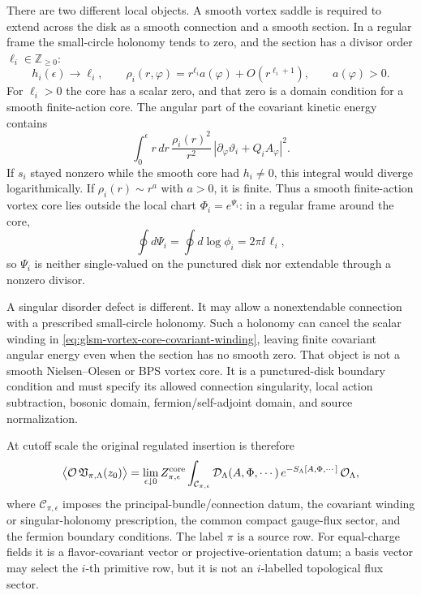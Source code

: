 \begin{construction}
There are two different local objects.  A smooth vortex saddle is required to
extend across the disk as a smooth connection and a smooth section.  In a
regular frame the small-circle holonomy tends to zero, and the section has a
divisor order \(\ell_i\in\mathbb Z_{\ge0}\):
\begin{equation}
  h_i(\epsilon)\longrightarrow \ell_i,\qquad
  \rho_i(r,\varphi)=r^{\ell_i}a(\varphi)+O(r^{\ell_i+1}),
  \qquad a(\varphi)>0 .
  \label{eq:glsm-vortex-core-boundary-data}
\end{equation}
For \(\ell_i>0\) the core has a scalar zero, and that zero is a domain
condition for a smooth finite-action core.  The angular part of the covariant
kinetic energy contains
\[
  \int_0^\epsilon r\,dr\,
  \frac{\rho_i(r)^2}{r^2}\,
  \left|\partial_\varphi\vartheta_i+Q_iA_\varphi\right|^2 .
\]
If \(s_i\) stayed nonzero while the smooth core had \(h_i\ne0\), this integral
would diverge logarithmically.  If \(\rho_i(r)\sim r^a\) with \(a>0\), it is
finite.  Thus a smooth finite-action vortex core lies outside the local chart
\(\Phi_i=e^{\Psi_i}\): in a regular frame around the core,
\[
  \oint d\Psi_i
  =
  \oint d\log\phi_i
  =
  2\pi\ii\,\ell_i ,
\]
so \(\Psi_i\) is neither single-valued on the punctured disk nor extendable
through a nonzero divisor.

A singular disorder defect is different.  It may allow a nonextendable
connection with a prescribed small-circle holonomy.  Such a holonomy can
cancel the scalar winding in
\eqref{eq:glsm-vortex-core-covariant-winding}, leaving finite covariant
angular energy even when the section has no smooth zero.  That object is not a
smooth Nielsen--Olesen or BPS vortex core.  It is a punctured-disk boundary
condition and must specify its allowed connection singularity, local action
subtraction, bosonic domain, fermion/self-adjoint domain, and source
normalization.

At cutoff scale the original regulated insertion is therefore
\begin{equation}
  \bigl\langle{\mathcal O}\,{\mathfrak V}_{\pi,\Lambda}(z_0)\bigr\rangle
  =
  \lim_{\epsilon\downarrow0}
  Z_{\pi,\epsilon}^{\rm core}
  \int_{\mathcal C_{\pi,\epsilon}}
  {\mathcal D}_{\Lambda}(A,\Phi,\cdots)\,
  e^{-S_\Lambda[A,\Phi,\cdots]}\,
  {\mathcal O}_{\Lambda},
  \label{eq:glsm-vortex-core-disorder-path-integral}
\end{equation}
where \(\mathcal C_{\pi,\epsilon}\) imposes the principal-bundle/connection
datum, the covariant winding or singular-holonomy prescription, the common
compact gauge-flux sector, and the fermion boundary conditions.  The label
\(\pi\) is a source row.  For equal-charge fields it is a flavor-covariant
vector or projective-orientation datum; a basis vector may select the
\(i\)-th primitive row, but it is not an \(i\)-labelled topological flux
sector.


\end{construction}
